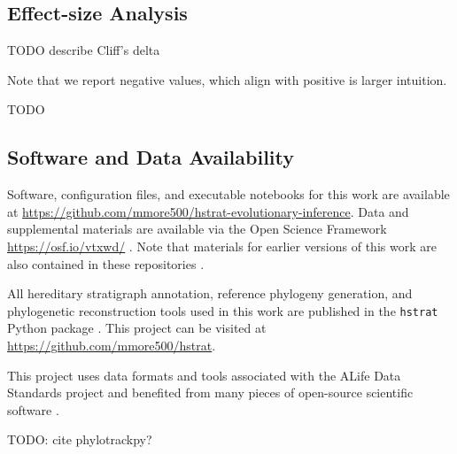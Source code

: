 \subsection{Effect-size Analysis}

TODO describe Cliff's delta
\citep{meissel2024using,cliff1993dominance}

Note that we report negative values, which align with positive is larger intuition.

TODO \citep{mann1947on}

\subsection{Software and Data Availability}

Software, configuration files, and executable notebooks for this work are available at \url{https://github.com/mmore500/hstrat-evolutionary-inference}.
Data and supplemental materials are available via the Open Science Framework \url{https://osf.io/vtxwd/} \citep{foster2017open}.
Note that materials for earlier versions of this work are also contained in these repositories \citep{moreno2023toward}.

All hereditary stratigraph annotation, reference phylogeny generation, and phylogenetic reconstruction tools used in this work are published in the \texttt{hstrat} Python package \citep{moreno2022hstrat}.
This project can be visited at \url{https://github.com/mmore500/hstrat}.

This project uses data formats and tools associated with the ALife Data Standards project \citep{lalejini2019data} and benefited from many pieces of open-source scientific software \citep{ofria2020empirical,sand2014tqdist,2020SciPy-NMeth,harris2020array,reback2020pandas,mckinney-proc-scipy-2010,sukumaran2010dendropy,cock2009biopython,torchiano2016effsize,waskom2021seaborn,hunter2007matplotlib,moreno2024apc,moreno2024qspool,moreno2023teeplot,hagen2021gen3sis,ofria2004avida,torchiano2016effsize}.

TODO: cite phylotrackpy?
